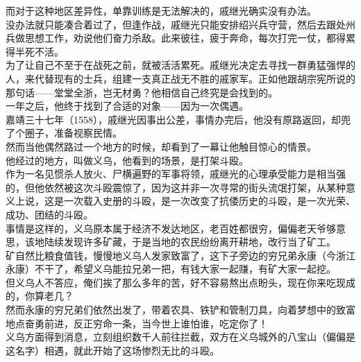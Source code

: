 \begin{multicols}{\theparacolNo}
而对于这种地区差异性，单靠训练是无法解决的，戚继光确实没有办法。\\

没办法就只能凑合着过了，但逢作战，戚继光只能安排绍兴兵守营，然后去跟处州兵做思想工作，劝说他们奋力杀敌。此来彼往，疲于奔命，每次打完一仗，都得累得半死不活。\\

为了让自己不至于在战死之前，就被活活累死。戚继光决定去寻找一群勇猛强悍的人，来代替现有的士兵，组建一支真正战无不胜的戚家军。正如他跟胡宗宪所说的那句话——堂堂全浙，岂无材勇？他相信自己终究是会找到的。\\

一年之后，他终于找到了合适的对象——因为一次偶遇。\\

嘉靖三十七年（1558），戚继光因事出公差，事情办完后，他没有原路返回，却兜了个圈子，准备视察民情。\\

然而当他偶然路过一个地方的时候，却看到了一幕让他触目惊心的情景。\\

他经过的地方，叫做义乌，他看到的场景，是打架斗殴。\\

作为一名见惯杀人放火、尸横遍野的军事将领，戚继光的心理承受能力是相当强的，但他依然被这次斗殴震惊了，因为这并非一次寻常的街头流氓打架，从某种意义上说，这是一次载入史册的斗殴，是一次改变了抗倭历史的斗殴，是一次光荣、成功、团结的斗殴。\\

事情是这样的，义乌原本属于经济不发达地区，老百姓都很穷，偏偏老天爷够意思，该地陆续发现许多矿藏，于是当地的农民纷纷离开耕地，改行当了矿工。\\

矿自然比粮食值钱，慢慢地义乌人发家致富了，这下子旁边的穷兄弟永康（今浙江永康）不干了，希望义乌能拉兄弟一把，有钱大家一起赚，有矿大家一起挖。\\

但义乌人不答应，俺们挨了那么多年的苦，好不容易熬出点盼头，现在你来吃现成的，你算老几？\\

然而永康的穷兄弟们依然出发了，带着农具、铁铲和管制刀具，向着梦想中的致富地点奋勇前进，反正穷命一条，当今世上谁怕谁，吃定你了！\\

义乌方面得到消息，立刻组织数千人前往拦截，双方在义乌城外的八宝山（偏偏是这名字）相遇，就此开始了这场惨烈无比的斗殴。\\


\end{multicols}
